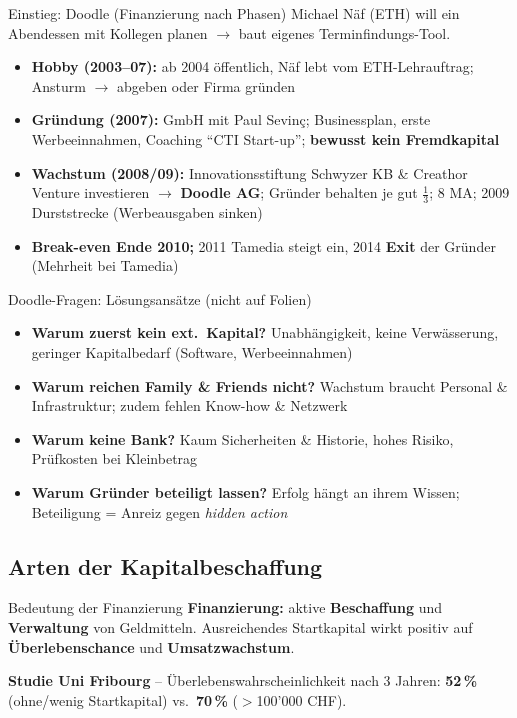 \documentclass[a4paper, fontsize=7pt]{scrartcl}
\begin{document}
\begin{subbox}{Einstieg: Doodle (Finanzierung nach Phasen)}
Michael Näf (ETH) will ein Abendessen mit Kollegen planen $\to$ baut eigenes
Terminfindungs-Tool.
\begin{itemize}
    \item \textbf{Hobby (2003--07):} ab 2004 öffentlich, Näf lebt vom
    ETH-Lehrauftrag; Ansturm $\to$ abgeben oder Firma gründen
    \item \textbf{Gründung (2007):} GmbH mit Paul Sevinç; Businessplan, erste
    Werbeeinnahmen, Coaching ``CTI Start-up''; \textbf{bewusst kein
    Fremdkapital}
    \item \textbf{Wachstum (2008/09):} Innovationsstiftung Schwyzer KB \&
    Creathor Venture investieren $\to$ \textbf{Doodle AG}; Gründer behalten
    je gut $\frac{1}{3}$; 8 MA; 2009 Durststrecke (Werbeausgaben sinken)
    \item \textbf{Break-even Ende 2010;} 2011 Tamedia steigt ein, 2014
    \textbf{Exit} der Gründer (Mehrheit bei Tamedia)
\end{itemize}
\end{subbox}

\begin{subbox}{Doodle-Fragen: Lösungsansätze (nicht auf Folien)}
\begin{itemize}
    \item \textbf{Warum zuerst kein ext.\ Kapital?} Unabhängigkeit, keine
    Verwässerung, geringer Kapitalbedarf (Software, Werbeeinnahmen)
    \item \textbf{Warum reichen Family \& Friends nicht?} Wachstum braucht
    Personal \& Infrastruktur; zudem fehlen Know-how \& Netzwerk
    \item \textbf{Warum keine Bank?} Kaum Sicherheiten \& Historie, hohes
    Risiko, Prüfkosten bei Kleinbetrag
    \item \textbf{Warum Gründer beteiligt lassen?} Erfolg hängt an ihrem
    Wissen; Beteiligung = Anreiz gegen \emph{hidden action}
\end{itemize}
\end{subbox}

\subsection{Arten der Kapitalbeschaffung}

\begin{mainbox}{Bedeutung der Finanzierung}
\textbf{Finanzierung:} aktive \textbf{Beschaffung} und \textbf{Verwaltung}
von Geldmitteln. Ausreichendes Startkapital wirkt positiv auf
\textbf{Überlebenschance} und \textbf{Umsatzwachstum}.

\textbf{Studie Uni Fribourg} -- Überlebenswahrscheinlichkeit nach 3 Jahren:
\textbf{52\,\%} (ohne/wenig Startkapital) vs.\ \textbf{70\,\%} ($>$100'000
CHF).
\end{mainbox}
\end{document}
